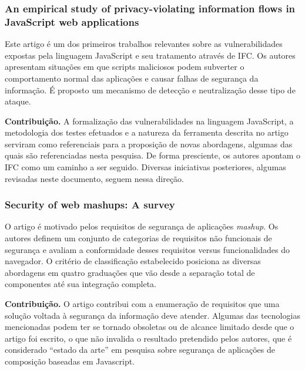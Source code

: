 \subsubsection{An empirical study of privacy-violating information flows in JavaScript web applications \cite{Jang2010}}
Este artigo é um dos primeiros trabalhos relevantes sobre as vulnerabilidades expostas pela linguagem JavaScript e seu tratamento através de IFC. Os autores apresentam situações em que scripts maliciosos podem subverter o comportamento normal das aplicações e causar falhas de segurança da informação. É proposto um mecanismo de detecção e neutralização desse tipo de ataque.

\textbf{Contribuição.} A formalização das vulnerabilidades na linguagem JavaScript, a metodologia dos testes efetuados e a natureza da ferramenta descrita no artigo serviram como referenciais para a proposição de novas abordagens, algumas das quais são referenciadas nesta pesquisa. De forma presciente, os autores apontam o IFC como um caminho a ser seguido. Diversas iniciativas posteriores, algumas revisadas neste documento, seguem nessa direção.


\subsubsection{Security of web mashups: A survey \cite{DeRyck2012}}
O artigo é motivado pelos requisitos de segurança de aplicações \textit{mashup}. Os autores definem um conjunto de categorias de requisitos não funcionais de segurança e avaliam a conformidade desses requisitos versus funcionalidades do navegador. O critério de classificação estabelecido posiciona as diversas abordagens em quatro graduações que vão desde a separação total de componentes até sua integração completa.

\textbf{Contribuição.} O artigo contribui com a enumeração de requisitos que uma solução voltada à segurança da informação deve atender. Algumas das tecnologias mencionadas podem ter se tornado obsoletas ou de alcance limitado desde que o artigo foi escrito, o que não invalida o resultado pretendido pelos autores, que é considerado ``estado da arte'' \cite{Hedin2014} em pesquisa sobre segurança de aplicações de composição baseadas em Javascript.


